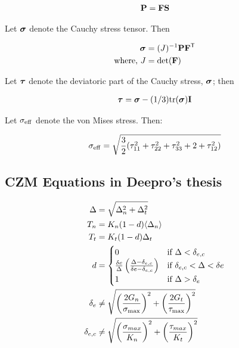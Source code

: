 \documentclass[../main.tex]{subfiles}
\begin{document}
\begin{align}
    \mathbf{P} &= \mathbf{F} \mathbf{S} \\
\end{align}


Let $\bm{\sigma}$ denote the Cauchy stress tensor. Then

\begin{align}
    \bm{\sigma} &= (J)^{-1} \mathbf{P} \mathbf{F}^{\sf {T}} \\
    \text{where, } J &= \rm{det}(\mathbf{F}) 
\end{align}




Let $\bm{\tau}$ denote the deviatoric part of the Cauchy stress, $\bm{\sigma}$; then

\begin{align}
    \bm{\tau} &= \bm{\sigma} - (1/3)\rm{tr}(\bm{\sigma})\mathbf{I} \\
\end{align}


Let $\sigma_{\rm{eff}}$ denote the von Mises stress. Then:

\begin{align}
    \sigma_{\rm{eff}} = \sqrt{\frac{3}{2}{(\tau^2_{11} + \tau^2_{22} + \tau^2_{33}} + 2+\tau^2_{12})}
\end{align}

\subsection{CZM Equations in Deepro's thesis}
\begin{align}
    \Delta &= \sqrt{\Delta_n^2 + \Delta_t^2}\\
    T_n &= K_n(1-d)\langle \Delta_n \rangle \\
    T_t &= K_t(1-d)\Delta_t\\
d &= \begin{cases}
    0 & \text{if } \Delta < \delta_{e, c} \\
    \frac{\delta{e}}{\Delta} \left( \frac{ \Delta - \delta_{e, c}}{\delta{e} - \delta_{e, c}} \right)  & \text{if } \delta_{e, c}< \Delta< \delta{e}\\
    1 & \text{if }\Delta>\delta_{e}
\end{cases}\\
\delta_e &\neq \sqrt{\left(\frac{2 G_n}{\sigma_{\rm{max}}}\right)^2 + \left(\frac{2 G_t}{\tau_{\rm{max}}}\right)^2 }\\
\delta_{e, c} &\neq \sqrt{\left(\frac{\sigma_{max}}{K_n}\right)^2 + \left(\frac{\tau_{max}}{K_t}\right)^2 }\\
\end{align}
\end{document}
